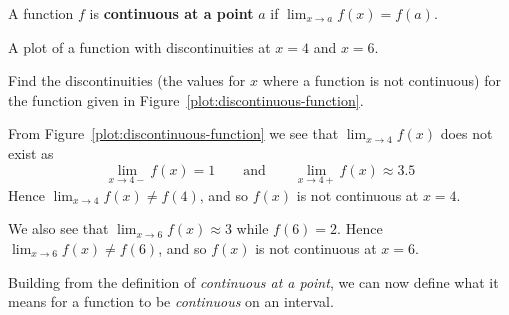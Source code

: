 \begin{definition} A function $f$ is \textbf{continuous
at a point} $a$ if $\lim_{x\to a} f(x) = f(a)$.  
\end{definition}
\begin{marginfigure}[0in]
\caption{A plot of a function with discontinuities at $x=4$ and $x=6$.}
\label{plot:discontinuous-function}
\end{marginfigure}

\begin{example}
Find the discontinuities (the values for $x$ where a function is not
continuous) for the function given in Figure~\ref{plot:discontinuous-function}.
\end{example}
\begin{solution}
From Figure~\ref{plot:discontinuous-function} we see that $\lim_{x\to 4} f(x)$ does not exist as
\[
\lim_{x\to 4-}f(x) = 1\qquad\text{and}\qquad \lim_{x\to 4+}f(x) \approx 3.5
\]
Hence $\lim_{x\to 4} f(x) \ne f(4)$, and so $f(x)$ is not
continuous at $x=4$.

We also see that $\lim_{x\to 6} f(x) \approx 3$ while $f(6) =
2$. Hence $\lim_{x\to 6} f(x) \ne f(6)$, and so $f(x)$ is not
continuous at $x=6$.
\end{solution}

Building from the definition of \textit{continuous at a point}, we can
now define what it means for a function to be \textit{continuous} on
an interval.

